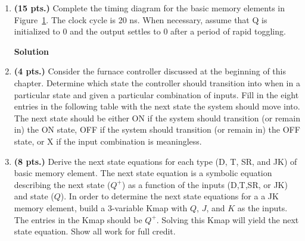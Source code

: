 \begin{enumerate}
\item \textbf{ (15 pts.)} Complete the timing diagram for the basic memory elements in 
Figure~\ref{fig:sequentialCirExTim2}.  The clock cycle is 20 ns. When necessary, 
assume that Q is initialized to 0 and the output settles to 0 after 
a period of rapid toggling. 
\begin{figure}[ht]
\caption{}
\label{fig:sequentialCirExTim2}
\end{figure}

\begin{onlysolution}  \textbf{Solution} \itshape{
\begin{figure}[ht]
\end{figure}
} \end{onlysolution} 


\item \textbf{ (4 pts.)} Consider the furnace 
controller discussed at the beginning of this chapter.  Determine 
which state the controller should transition into when in a particular state
and given a particular combination of inputs.  
Fill in the eight entries in the following table with the next state
the system should move into.  The next state should be either ON if the 
system should transition (or remain in) the ON state, OFF if the system 
should transition (or remain in) the OFF state, or X if the input 
combination is meaningless. 

\begin{table}[ht]
\end{table}
 
\item \textbf{ (8 pts.)} Derive the next state equations for each 
type (D, T, SR, and JK) of basic memory element.  The next state equation 
is a symbolic equation describing the next state ($Q^+$) 
as a function of the inputs (D,T,SR, or JK) and state ($Q$).
In order to determine the next state equations for a
a JK memory element, build a 3-variable Kmap with 
$Q$, $J$, and $K$ as the inputs.  The entries in the Kmap should 
be $Q^+$.  Solving this Kmap will yield the next state equation.
Show all work for full credit.


\end{enumerate}
